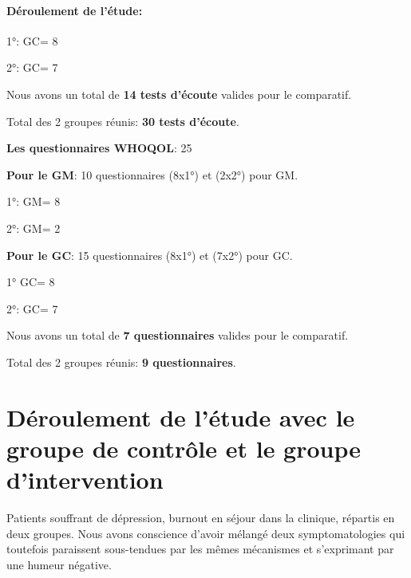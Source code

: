      
\paragraph{Déroulement de l'étude:}


     1°: GC= 8

     2°: GC= 7
     
     Nous avons un total de \textbf{14 tests d'écoute} valides pour le
     comparatif.

     
Total des 2 groupes réunis:\textbf{ 30 tests d'écoute}.
     


\textbf{Les questionnaires WHOQOL}: 25

     \textbf{Pour le GM}:      
     10 questionnaires (8x1°) et (2x2°) pour GM.
     
     1°: GM= 8 

     
     2°: GM= 2
   
     
\textbf{ Pour le GC}:
15 questionnaires (8x1°) et (7x2°) pour GC.
    
     1° GC= 8
     
     2°: GC= 7
     
     Nous avons un total de \textbf{7 questionnaires} valides pour le
     comparatif.
     
Total des 2 groupes réunis: \textbf{9 questionnaires}.
    
 
          
 
 
 	
 	
       

 	
 	\section{Déroulement de l'étude avec le groupe
          de contrôle et le groupe d'intervention}





                                      Patients souffrant de dépression, burnout
                                               en séjour dans la
                                               clinique, répartis en
                                               deux groupes.
                                               Nous avons conscience
                                               d'avoir mélangé deux
                                               symptomatologies qui
                                               toutefois paraissent
                                               sous-tendues par les
                                               mêmes mécanismes et
                                               s'exprimant par une
                                               humeur négative.

